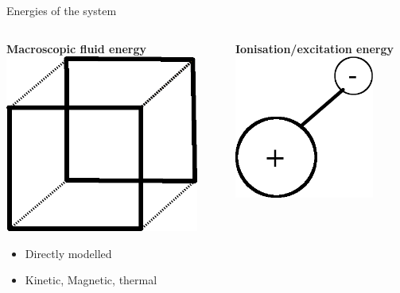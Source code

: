 \documentclass[10pt,aspectratio=169,usenames,dvipsnames]{beamer}
\begin{document}
\begin{frame}{Energies of the system}
\begin{columns}
\begin{column}{0.3\textwidth}
\centering
\textbf{Macroscopic fluid energy}
\includegraphics[width=0.9\textwidth]{2023ECRW/Figures/fluidelement.png}
\begin{itemize}
    \item Directly modelled
    \item Kinetic, Magnetic, thermal
\end{itemize}
\end{column}
\begin{column}{0.3\textwidth}
\centering
\textbf{Ionisation/excitation energy}
\includegraphics[width=0.8\textwidth]{2023ECRW/Figures/ionenergy.png}

\end{column}
\end{columns}
\end{frame}
\end{document}
